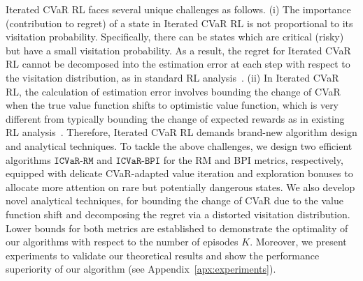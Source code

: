 \documentclass{article} %
\newcommand{\algcvar}{\mathtt{ICVaR\mbox{-}RM}}
\newcommand{\algcvarbpi}{\mathtt{ICVaR\mbox{-}BPI}}
\newcommand{\longbo}[1]{}
\newcommand{\longbo}[1]{{\color{red}  [\text{Longbo:} #1]}}
\begin{document}
	Iterated CVaR RL faces several unique challenges as follows. 
	(i) The importance (contribution to regret) of a state in Iterated CVaR RL is not proportional to its visitation probability. Specifically, there can be states which are critical (risky) but have a small visitation probability. As a result, the regret for Iterated CVaR RL cannot be decomposed into the estimation error at each step with respect to the visitation distribution, as in standard RL analysis~\citep{jaksch2010near,azar2017minimax,zanette2019tighter}.
	(ii) In Iterated CVaR RL, the calculation of estimation error involves bounding the change of CVaR when the true value function shifts to optimistic value function, which is very different from typically bounding the change of expected rewards as in existing RL analysis~\citep{jaksch2010near,azar2017minimax,jin2018q}.
	Therefore, Iterated CVaR RL demands brand-new algorithm design and analytical techniques. 
	To tackle the above challenges, we design two efficient algorithms $\algcvar$ and $\algcvarbpi$ for the RM and BPI metrics, respectively, equipped with delicate CVaR-adapted value iteration and exploration bonuses to allocate more attention on rare but potentially dangerous states. 
	We also develop novel analytical techniques, for bounding the change of CVaR due to the value function shift and decomposing the regret via a distorted visitation distribution.
	Lower bounds for both metrics are established to demonstrate the optimality of our algorithms with respect to the number of episodes $K$. Moreover, we present experiments to validate our theoretical results and show the performance superiority of our algorithm (see Appendix~\ref{apx:experiments}). 
	
	
\end{document}
